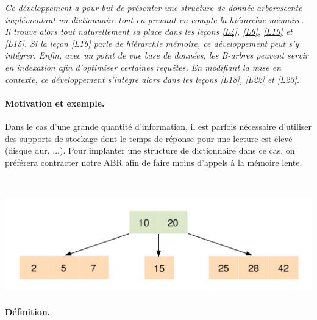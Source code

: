 


\textit{Ce développement a pour but de présenter une structure de donnée arborescente implémentant un dictionnaire tout en prenant en compte la hiérarchie mémoire. Il trouve alors tout naturellement sa place dans les leçons \ref{L4}, \ref{L6}, \ref{L10} et \ref{L15}. Si la leçon \ref{L16} parle de hiérarchie mémoire, ce développement peut s'y intégrer. 
Enfin, avec un point de vue base de données, les B-arbres peuvent servir en indexation afin d'optimiser certaines requêtes. En modifiant la mise en contexte, ce développement s'intègre alors dans les leçons \ref{L18}, \ref{L22} et \ref{L23}.}

\paragraph{Motivation et exemple.}
Dans le cas d’une grande quantité d’information, il est parfois nécessaire d’utiliser des supports de stockage dont le temps de réponse pour une lecture est élevé (disque dur, ...). Pour implanter une structure de dictionnaire dans ce cas, on préférera contracter notre ABR afin de faire moins d'appels à la mémoire lente.

\begin{example}~

\begin{center}
\includegraphics[scale=0.5]{Developpements/B-arbres/exemple.pdf}
\end{center}
\end{example}

\paragraph{Définition.}

